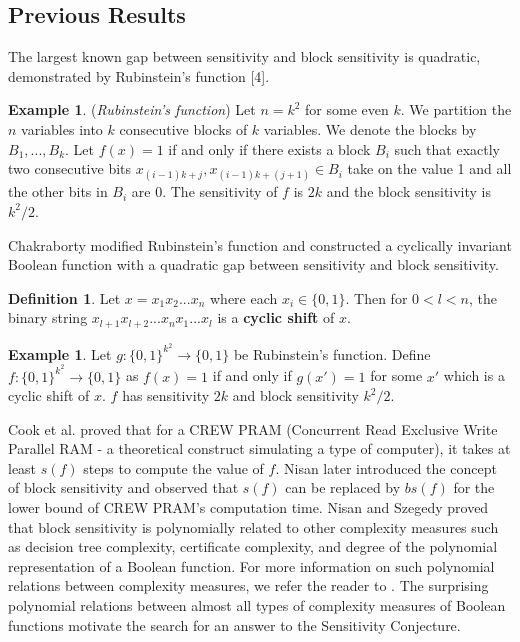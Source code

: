 \documentclass[psamsfonts]{amsart}
\theoremstyle{definition}
\newtheorem{defn}[theorem]{Definition}
\newtheorem{exmp}[theorem]{Example}
\theoremstyle{remark}
\numberwithin{equation}{section}
\begin{document}
	\subsection{Previous Results}

		The largest known gap between sensitivity and block sensitivity is quadratic, demonstrated by Rubinstein's function [4].
	\begin{exmp} ({\it Rubinstein's function})
		Let $n = k^2$ for some even $k$. We partition the $n$ variables into $k$ consecutive blocks of $k$ variables. We denote the blocks by $B_1,...,B_k$. Let $f(x) = 1$ if and only if there exists a block $B_i$ such that exactly two consecutive bits $x_{(i-1)k+j}, x_{(i-1)k+(j+1)} \in B_i$ take on the value 1 and all the other bits in $B_i$ are 0. The sensitivity of $f$ is $2k$ and the block sensitivity is $k^2/2$.
	\end{exmp}

	Chakraborty modified Rubinstein's function and constructed a cyclically invariant Boolean function with a quadratic gap between sensitivity and block sensitivity.
\begin{defn} Let $x = x_1x_2...x_n$ where each $x_i \in \{0,1\}$. Then for $0 < l < n$, the binary string $x_{l+1}x_{l+2}...x_nx_1...x_l$ is a \textbf{cyclic shift} of $x$.
\end{defn}

	\begin{exmp}
		Let $g : \{0,1\}^{k^2} \rightarrow \{0,1\}$ be Rubinstein's function. Define $f : \{0,1\}^{k^2} \rightarrow \{0,1\}$ as $f(x) = 1$ if and only if $g(x') = 1$ for some $x'$ which is a cyclic shift of $x$. $f$ has sensitivity $2k$ and block sensitivity $k^2/2$.
	\end{exmp}
	Cook et al. \cite{CDR} proved that for a CREW PRAM (Concurrent Read Exclusive Write Parallel RAM - a theoretical construct simulating a type of computer), it takes at least $s(f)$ steps to compute the value of $f$. Nisan \cite{N} later introduced the concept of block sensitivity and observed that $s(f)$ can be replaced by $bs(f)$ for the lower bound of CREW PRAM's 
	computation time.  
	Nisan and Szegedy \cite{NS} proved that block sensitivity is polynomially related to other complexity measures such as decision tree complexity, certificate complexity, and degree of the polynomial representation of a Boolean function.  For more information on such polynomial relations between complexity measures, we refer the reader to \cite{HKP}.  The surprising polynomial relations between almost all types of complexity measures of Boolean functions motivate the search for an answer to the Sensitivity Conjecture. 
	
\end{document}
